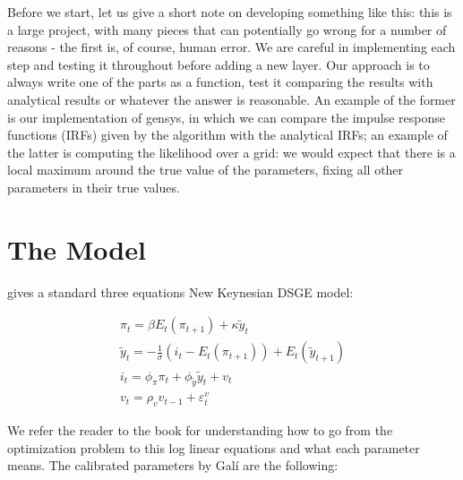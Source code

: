 \documentclass[12pt,a4paper]{article}
\begin{document}
Before we start, let us give a short note on developing something like this: this is a large project, with many pieces that can potentially go wrong for a number of reasons - the first is, of course, human error. We are careful in implementing each step and testing it throughout before adding a new layer. Our approach is to always write one of the parts as a function, test it comparing the results with analytical results or whatever the answer is reasonable. An example of the former is our implementation of gensys, in which we can compare the impulse response functions (IRFs) given by the algorithm with the analytical IRFs; an example of the latter is computing the likelihood over a grid: we would expect that there is a local maximum around the true value of the parameters, fixing all other parameters in their true values.

\section{The Model}
\cite{Gali2009} gives a standard three equations New Keynesian DSGE model:

\begin{align} 
\pi_t = \beta E_t(\pi_{t+1}) + \kappa \tilde{y}_t\\
\tilde{y}_t = -\frac{1}{\sigma} (i_t - E_t(\pi_{t+1})) + E_t(\tilde{y}_{t+1})\\
i_t = \phi_{\pi} \pi_t + \phi_{\tilde{y}} \tilde{y}_t + v_t\\
v_t = \rho_v v_{t-1} + \varepsilon_t^v
\end{align}

We refer the reader to the book for understanding how to go from the optimization problem to this log linear equations and what each parameter means. The calibrated parameters by Galí are the following:
\end{document}
